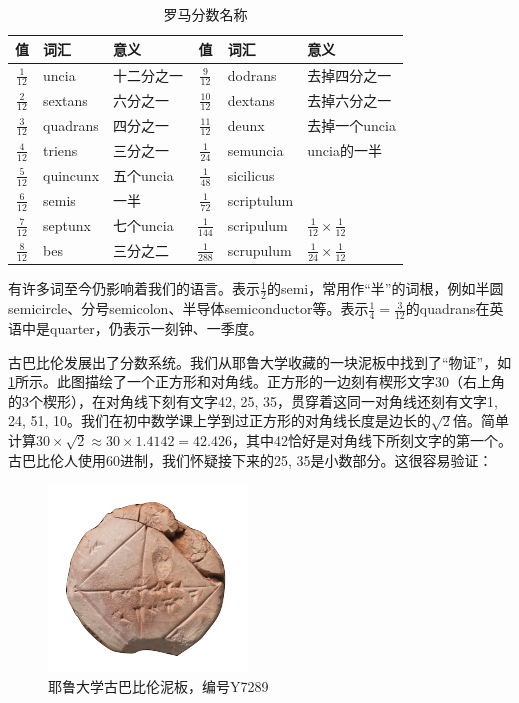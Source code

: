 \documentclass[b5paper]{ctexart}
\begin{document}
\begin{table}
  \centering
  \begin{tabular}{|c|l|l||c|l|l|}
  \hline
  值 & 词汇 & 意义 & 值 & 词汇 & 意义 \\
  \hline
  $\frac{1}{12}$ & uncia    & 十二分之一 & $\frac{9}{12}$ & dodrans    & 去掉四分之一 \\
  \hline
  $\frac{2}{12}$ & sextans  & 六分之一 & $\frac{10}{12}$ & dextans   & 去掉六分之一 \\
  \hline
  $\frac{3}{12}$ & quadrans & 四分之一 & $\frac{11}{12}$ & deunx    & 去掉一个uncia \\
  \hline
  $\frac{4}{12}$ & triens   & 三分之一 & $\frac{1}{24}$ & semuncia   & uncia的一半  \\
  \hline
  $\frac{5}{12}$ & quincunx & 五个uncia & $\frac{1}{48}$ & sicilicus &  \\
  \hline
  $\frac{6}{12}$ & semis    & 一半    & $\frac{1}{72}$ & scriptulum    &  \\
  \hline
  $\frac{7}{12}$ & septunx  & 七个uncia & $\frac{1}{144}$ & scripulum  &  $\frac{1}{12} \times \frac{1}{12}$ \\
  \hline
  $\frac{8}{12}$ & bes      & 三分之二 & $\frac{1}{288}$ & scrupulum    &  $\frac{1}{24} \times \frac{1}{12}$\\
  \hline
  \end{tabular}
  \caption{罗马分数名称}
  \label{tab:roman-fractions}
\end{table}

有许多词至今仍影响着我们的语言。表示$\frac{1}{2}$的semi，常用作“半”的词根，例如半圆semicircle、分号semicolon、半导体semiconductor等。表示$\frac{1}{4} = \frac{3}{12}$的quadrans在英语中是quarter，仍表示一刻钟、一季度。

古巴比伦发展出了分数系统。我们从耶鲁大学收藏的一块泥板中找到了“物证”，如\cref{fig:babylonian-yale}所示。此图描绘了一个正方形和对角线。正方形的一边刻有楔形文字30（右上角的3个楔形），在对角线下刻有文字42, 25, 35，贯穿着这同一对角线还刻有文字1, 24, 51, 10。我们在初中数学课上学到过正方形的对角线长度是边长的$\sqrt{2}$倍。简单计算$30 \times \sqrt{2} \approx 30 \times 1.4142 = 42.426$，其中42恰好是对角线下所刻文字的第一个。古巴比伦人使用60进制，我们怀疑接下来的25, 35是小数部分。这很容易验证：

\begin{figure}[htbp]
 \centering
 \includegraphics[scale=0.8]{img/babylonian-yale}
 \caption{耶鲁大学古巴比伦泥板，编号Y7289}
 \label{fig:babylonian-yale}
\end{figure}
\end{document}

